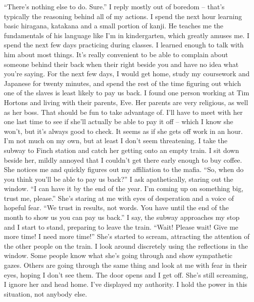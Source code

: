\documentclass[a4paper, 12pt]{book}
\begin{document}
\newline
\tab
``There’s nothing else to do. Sure.'' I reply mostly out of boredom -- that’s typically the reasoning behind all of my actions. I spend the next hour learning basic hiragana, katakana and a small portion of kanji. He teaches me the fundamentals of his language like I’m in kindergarten, which greatly amuses me. I spend the next few days practicing during classes. I learned enough to talk with him about most things. It’s really convenient to be able to complain about someone behind their back when their right beside you and have no idea what you’re saying.
\newline
\tab
For the next few days, I would get home, study my coursework and Japanese for twenty minutes, and spend the rest of the time figuring out which one of the slaves is least likely to pay us back. I found one person working at Tim Hortons and living with their parents, Eve. Her parents are very religious, as well as her boss. That should be fun to take advantage of. I’ll have to meet with her one last time to see if she’ll actually be able to pay it off -- which I know she won’t, but it’s always good to check. It seems as if she gets off work in an hour. I’m not much on my own, but at least I don’t seem threatening.
\newline
\tab
I take the subway to Finch station and catch her getting onto an empty train. I sit down beside her, mildly annoyed that I couldn’t get there early enough to buy coffee.  She notices me and quickly figures out my affiliation to the mafia. ``So, when do you think you’ll be able to pay us back?'' I ask apathetically, staring out the window.
\newline
\tab
``I can have it by the end of the year. I’m coming up on something big, trust me, please.'' She’s staring at me with eyes of desperation and a voice of hopeful fear.
\newline
\tab
``We trust in results, not words. You have until the end of the month to show us you can pay us back.'' I say, the subway approaches my stop and I start to stand, preparing to leave the train.
\newline
\tab
``Wait! Please wait! Give me more time! I need more time!'' She’s started to scream, attracting the attention of the other people on the train. I look around discretely using the reflections in the window. Some people know what she’s going through and show sympathetic gazes. Others are going through the same thing and look at me with fear in their eyes, hoping I don’t see them. The door opens and I get off. She’s still screaming, I ignore her and head home. I’ve displayed my authority. I hold the power in this situation, not anybody else.
\end{document}
